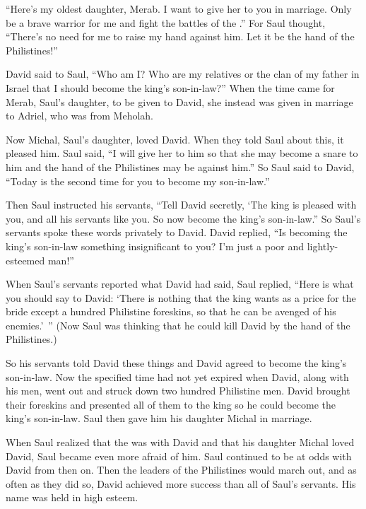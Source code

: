{“Here’s
my oldest
daughter,
Merab.
I want to give
her to you in marriage.
Only
be
a
brave
warrior for me and fight
the battles
of the {}.” For Saul
thought,
“There’s no
need for me to raise my hand
against him. Let it be
the hand
of the Philistines!”
\par }{\PP {}David
said
to
Saul,
“Who
am
I? Who
are my relatives or the clan
of my father
in Israel
that
I should
become
the king’s
son-in-law?”
When
the time
came for Merab,
Saul’s
daughter,
to be given to David,
she
instead was given
in marriage
to Adriel,
who was from Meholah.
\par }{\PP {}Now Michal,
Saul’s
daughter,
loved
David.
When they told
Saul
about this, it pleased him.
Saul
said,
“I will give
her to him so that she may become a snare
to him and the hand
of the Philistines
may be against him.” So Saul
said to
David,
“Today
is the second
time for you to become my son-in-law.”
\par }{\PP {}Then Saul
instructed
his servants,
“Tell
David
secretly,
‘The king
is
pleased
with you, and all
his servants
like
you. So now
become the king’s
son-in-law.”
So Saul’s
servants
spoke
these
words
privately
to David.
David
replied,
“Is becoming the king’s
son-in-law
something insignificant
to you? I’m
just a poor
and lightly-esteemed
man!”
\par }{\PP {}When Saul’s
servants
reported
what David
had said,
Saul
replied,
“Here is what
you should say
to David: ‘There is nothing
that the king
wants
as a price
for
the bride
except a hundred
Philistine
foreskins,
so that he can be avenged
of his enemies.’ ”
(Now Saul
was thinking
that he could kill David
by the hand
of the Philistines.)
\par }{\PP {}So his servants
told
David
these
things
and David
agreed
to become the king’s
son-in-law.
Now the specified time
had not
yet expired
when David,
along
with his men,
went out
and struck down
two hundred
Philistine
men.
David
brought
their foreskins
and presented all of them to the king
so he could become the king’s
son-in-law.
Saul
then gave
him his daughter
Michal
in marriage.
\par }{\PP {}When Saul
realized
that
the {}
was with
David
and that his
daughter
Michal
loved David,
Saul
became even more
afraid
of him.
Saul
continued
to be at odds
with David
from then on.
Then
the leaders
of the Philistines
would march out,
and as often
as they did
so,
David
achieved
more success than all
of Saul’s
servants.
His name
was
held in high esteem.

}
